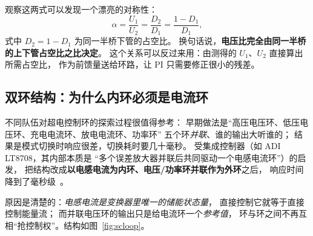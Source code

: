 \documentclass[cn,blue,11pt,device=normal]{elegantnote}
\begin{document}
观察这两式可以发现一个漂亮的对称性：
\begin{equation}\label{eq:dualsym}
  \alpha = \frac{U_1}{U_2} = \frac{D_2}{D_1} = \frac{1-D_1}{D_1} ,
\end{equation}
式中 $D_2=1-D_1$ 为同一半桥下管的占空比。
换句话说，\textbf{电压比完全由同一半桥的上下管占空比之比决定}。
这个关系可以反过来用：由测得的 $U_1$、$U_2$ 直接算出所需占空比，
作为前馈量送给环路，让 PI 只需要修正很小的残差。

\subsection{双环结构：为什么内环必须是电流环}

不同队伍对超电控制环的探索过程很值得参考：
早期做法是“高压电压环、低压电压环、充电电流环、放电电流环、功率环”
五个环\emph{并联}、谁的输出大听谁的；
结果是模式切换时响应很差，切换耗时要几十毫秒。
受集成控制器（如 ADI LT8708，其内部本质是
“多个误差放大器并联后共同驱动一个电感电流环”）的启发，
把结构改成\textbf{以电感电流为内环、电压/功率环并联作为外环}之后，
响应时间降到了毫秒级~\cite{hitszsupercap}。

原因是清楚的：\emph{电感电流是变换器里唯一的储能状态量}，
直接控制它就等于直接控制能量流；
而并联电压环的输出只是给电流环一个\emph{参考值}，
环与环之间不再互相“抢控制权”。结构如图~\ref{fig:scloop}。
\end{document}
